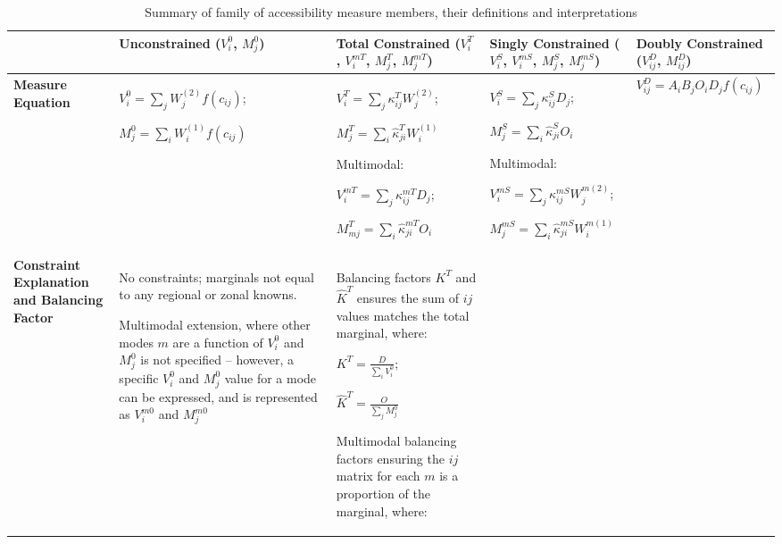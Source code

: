{\tiny
\begin{longtable}{|p{1.2cm}|p{2cm}|p{3.8cm}|p{3.7cm}|p{2cm}|}
\caption{Summary of family of accessibility measure members, their definitions and interpretations} \label{tab:summary-family-access-measures-table} \\
\hline
\textbf{ } & \textbf{Unconstrained ($V_i^0$, $M_j^0$)} & \textbf{Total Constrained ($V_i^T$, $V_i^{mT}$, $M_j^T$, $M_j^{mT}$)} & \textbf{Singly Constrained ($V_i^S$, $V_i^{mS}$, $M_j^S$, $M_j^{mS}$)} & \textbf{Doubly Constrained ($V_{ij}^D$, $M_{ij}^D$)} \\
\hline
\endfirsthead

\textbf{Measure Equation} &
$V_i^0 = \sum_j W^{(2)}_j f(c_{ij})$;

$M_j^0 = \sum_i W^{(1)}_i f(c_{ij})$ 

&
$V^T_i = \sum_j  \kappa_{ij}^T W^{(2)}_j$;

$M_j^T =\sum_i \hat{\kappa}_{ji}^T  W^{(1)}_i$

Multimodal:

$V^{mT}_i = \sum_j \kappa_{ij}^{mT} D_j$;

$M_{mj}^T = \sum_i \hat{\kappa}_{ji}^{mT} O_i$ 

&
$V^S_i = \sum_j \kappa^S_{ij} D_j$;

$M_j^S = \sum_i \hat \kappa^S_{ji}  O_i$

Multimodal:

$V^{mS}_i = \sum_j \kappa_{ij}^{mS} W^{m(2)}_j$;

$M^{mS}_j = \sum_i \hat{\kappa}_{ji}^{mS} W^{m(1)}_i$ 

&
$V_{ij}^D = A_i B_j O_i D_j f(c_{ij})$ \\
\hline

\textbf{Constraint Explanation and Balancing Factor} &
No constraints; marginals not equal to any regional or zonal knowns.

Multimodal extension, where other modes $m$ are a function of $V_i^0$ and $M_j^0$ is not specified -- however, a specific $V_i^0$ and $M_j^0$ value for a mode can be expressed, and is represented as $V_i^{m0}$ and $M_j^{m0}$ 
&
Balancing factors $K^T$ and $\hat{K}^T$ ensures the sum of $ij$ values matches the total marginal, where:

$K^T = \frac{D}{\sum_i V_i^0}$;

$\hat{K}^T = \frac{O}{\sum_j M_j^0}$ 

Multimodal balancing factors ensuring the $ij$ matrix for each $m$ is a proportion of the marginal, where: 


\end{longtable}}
